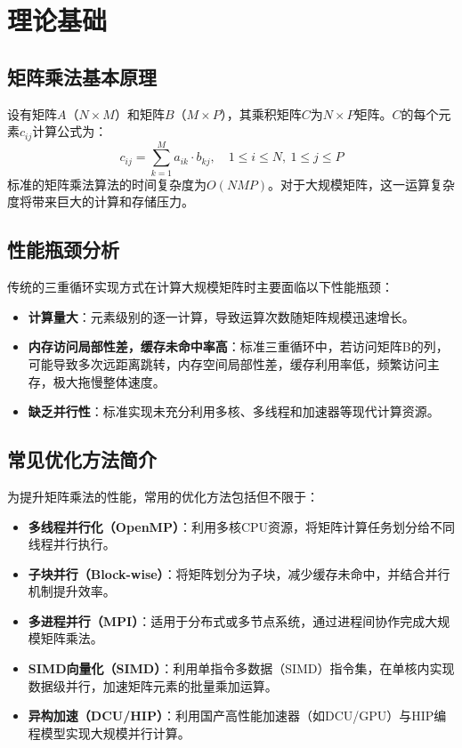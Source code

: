\documentclass[UTF8,a4paper,10pt]{ctexart}
\begin{document}

\section{理论基础}
\subsection{矩阵乘法基本原理}
设有矩阵$A$（$N\times M$）和矩阵$B$（$M\times P$），其乘积矩阵$C$为$N\times P$矩阵。$C$的每个元素$c_{ij}$计算公式为：
\begin{equation}
    c_{ij} = \sum_{k=1}^{M} a_{ik} \cdot b_{kj}, \quad 1 \leq i \leq N,\ 1 \leq j \leq P
\end{equation}
标准的矩阵乘法算法的时间复杂度为$O(NMP)$。对于大规模矩阵，这一运算复杂度将带来巨大的计算和存储压力。

\subsection{性能瓶颈分析}
传统的三重循环实现方式在计算大规模矩阵时主要面临以下性能瓶颈：
\begin{itemize}
    \item \textbf{计算量大}：元素级别的逐一计算，导致运算次数随矩阵规模迅速增长。
    \item \textbf{内存访问局部性差，缓存未命中率高}：标准三重循环中，若访问矩阵B的列，可能导致多次远距离跳转，内存空间局部性差，缓存利用率低，频繁访问主存，极大拖慢整体速度。
    \item \textbf{缺乏并行性}：标准实现未充分利用多核、多线程和加速器等现代计算资源。
\end{itemize}

\subsection{常见优化方法简介}
为提升矩阵乘法的性能，常用的优化方法包括但不限于：
\begin{itemize}
    \item \textbf{多线程并行化（OpenMP）}：利用多核CPU资源，将矩阵计算任务划分给不同线程并行执行。
    \item \textbf{子块并行（Block-wise）}：将矩阵划分为子块，减少缓存未命中，并结合并行机制提升效率。
    \item \textbf{多进程并行（MPI）}：适用于分布式或多节点系统，通过进程间协作完成大规模矩阵乘法。
    \item \textbf{SIMD向量化（SIMD）}：利用单指令多数据（SIMD）指令集，在单核内实现数据级并行，加速矩阵元素的批量乘加运算。
    \item \textbf{异构加速（DCU/HIP）}：利用国产高性能加速器（如DCU/GPU）与HIP编程模型实现大规模并行计算。
\end{itemize}
\end{document}
